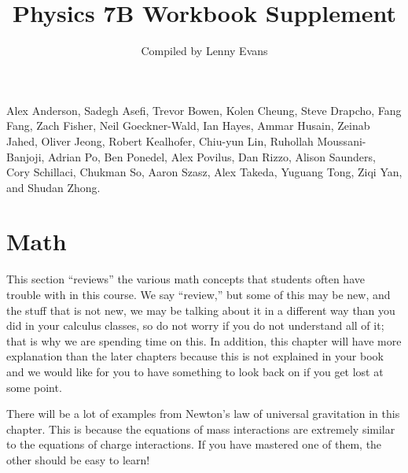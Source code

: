 \documentclass[12pt]{book}
\title{Physics 7B Workbook Supplement}
\author{Compiled by Lenny Evans}
\begin{document}
\maketitle



 Alex Anderson, Sadegh Asefi, Trevor Bowen, Kolen Cheung, Steve Drapcho, Fang Fang, Zach Fisher, Neil Goeckner-Wald, Ian Hayes, Ammar Husain, Zeinab Jahed, Oliver Jeong, Robert Kealhofer, Chiu-yun Lin, Ruhollah Moussani-Banjoji, Adrian Po, Ben Ponedel, Alex Povilus, Dan Rizzo, Alison Saunders, Cory Schillaci, Chukman So, Aaron Szasz, Alex Takeda, Yuguang Tong, Ziqi Yan, and Shudan Zhong.

\tableofcontents

\chapter{Math}

\noindent This section ``reviews'' the various math concepts that students often have trouble with in this course. We say ``review,'' but some of this may be new, and the stuff that is not new, we may be talking about it in a different way than you did in your calculus classes, so do not worry if you do not understand all of it; that is why we are spending time on this. In addition, this chapter will have more explanation than the later chapters because this is not explained in your book and we would like for you to have something to look back on if you get lost at some point.

 There will be a lot of examples from Newton's law of universal gravitation in this chapter. This is because the equations of mass interactions are extremely similar to the equations of charge interactions. If you have mastered one of them, the other should be easy to learn!
\end{document}
